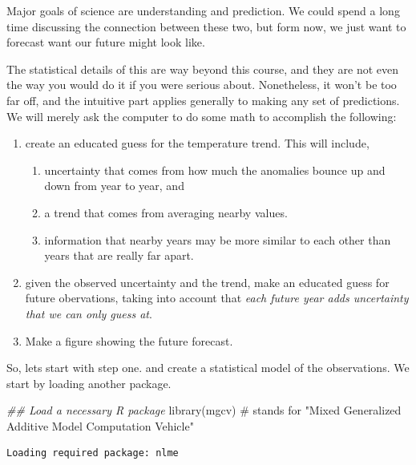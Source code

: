 \documentclass[
  letterpaper,
  DIV=11,
  numbers=noendperiod]{scrreprt}
\newenvironment{Shaded}{\begin{snugshade}}{\end{snugshade}}
\newcommand{\CommentTok}[1]{\textcolor[rgb]{0.37,0.37,0.37}{#1}}
\newcommand{\DocumentationTok}[1]{\textcolor[rgb]{0.37,0.37,0.37}{\textit{#1}}}
\newcommand{\FunctionTok}[1]{\textcolor[rgb]{0.28,0.35,0.67}{#1}}
\newcommand{\NormalTok}[1]{\textcolor[rgb]{0.00,0.23,0.31}{#1}}
\providecommand{\tightlist}{%
  \setlength{\itemsep}{0pt}\setlength{\parskip}{0pt}}
\begin{document}
Major goals of science are understanding and prediction. We could spend
a long time discussing the connection between these two, but form now,
we just want to forecast want our future might look like.

The statistical details of this are way beyond this course, and they are
not even the way you would do it if you were serious about. Nonetheless,
it won't be too far off, and the intuitive part applies generally to
making any set of predictions. We will merely ask the computer to do
some math to accomplish the following:

\begin{enumerate}
\def\labelenumi{\arabic{enumi}.}
\tightlist
\item
  create an educated guess for the temperature trend. This will include,

  \begin{enumerate}
  \def\labelenumii{\alph{enumii}.}
  \tightlist
  \item
    uncertainty that comes from how much the anomalies bounce up and
    down from year to year, and
  \item
    a trend that comes from averaging nearby values.
  \item
    information that nearby years may be more similar to each other than
    years that are really far apart.
  \end{enumerate}
\item
  given the observed uncertainty and the trend, make an educated guess
  for future obervations, taking into account that \emph{each future
  year adds uncertainty that we can only guess at}.
\item
  Make a figure showing the future forecast.
\end{enumerate}

So, lets start with step one. and create a statistical model of the
observations. We start by loading another package.

\begin{Shaded}
\begin{Highlighting}[]
\DocumentationTok{\#\# Load a necessary R package}
\FunctionTok{library}\NormalTok{(mgcv) }\CommentTok{\# stands for "Mixed Generalized Additive Model Computation Vehicle"}
\end{Highlighting}
\end{Shaded}

\begin{verbatim}
Loading required package: nlme
\end{verbatim}
\end{document}
